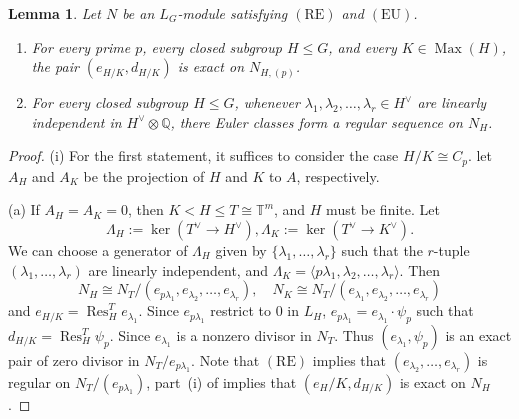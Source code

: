 \documentclass[11pt,reqno]{amsart}
\newtheorem{lemma}[lemma]{Lemma}
\newcommand{\bbT}{\mathbb T}
\newcommand{\Max}{\operatorname{Max}}
\begin{document}
\begin{lemma}\label{lem:compact exactness condition}
Let $N$ be an $L_G$-module satisfying $(\mathrm{RE})$ and $(\mathrm{EU})$. 
\begin{enumerate}[label=\textup{(\roman*)},leftmargin=3em]
  \item For every prime $p$, every closed subgroup $H\leq G$, and every $K\in\Max(H)$, the pair $(e_{H/K},d_{H/K})$ is exact on $N_{H,(p)}$. 
  \item For every closed subgroup $H\leq G$, whenever $\lambda_1,\lambda_2, \dots, \lambda_r\in H^\vee$ are linearly independent in $H^\vee\otimes \mathbb Q$, there Euler classes form a regular sequence on $N_H$.
\end{enumerate}
\end{lemma}
\begin{proof}
  (i) For the first statement, it suffices to consider the case $H/K\cong C_p$. let $A_H$ and $A_K$ be the projection of $H$ and $K$ to $A$, respectively. 
  
  (a) If $A_H=A_K=0$, then $K< H\leq T\cong \bbT^m$, and $H$ must be finite. Let 
  \[
  \Lambda_H:=\ker (T^\vee \to H^\vee), \Lambda_K:=\ker ( T^\vee\to K^\vee).
  \]
  We can choose a generator of $\Lambda_H$ given by $\{\lambda_1,\dots, \lambda_r\}$ such that the $r$-tuple $(\lambda_1,\dots,\lambda_r)$ are linearly independent, and $\Lambda_K=\langle p\lambda_1,\lambda_2,\dots, \lambda_r\rangle$. Then
  \[
  N_H \cong N_T/(e_{p\lambda_1},e_{\lambda_2}, \dots, e_{\lambda_r}),\quad N_K \cong N_T/(e_{\lambda_1},e_{\lambda_2}, \dots, e_{\lambda_r})
  \]
  and $e_{H/K}=\operatorname{Res}_H^T e_{\lambda_1}$. Since $e_{p\lambda_1}$ restrict to $0$ in $L_H$, $e_{p\lambda_1}=e_{\lambda_1}\cdot \psi_p$ such that $d_{H/K}=\operatorname{Res}_H^T \psi_p$. Since $e_{\lambda_1}$ is a nonzero divisor in $N_T$. Thus $(e_{\lambda_1}, \psi_p)$ is an exact pair of zero divisor in $N_T/e_{p\lambda_1}$. Note that $(\mathrm{RE})$ implies that $(e_{\lambda_2},\dots, e_{\lambda_r})$ is regular on $N_T/(e_{p\lambda_1})$, part~\textup{(i)} of  implies that $(e_H/K,d_{H/K})$ is exact on $N_H$. 


\end{proof}
\end{document}
